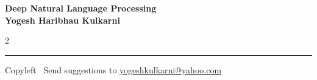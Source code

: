 \documentclass[8pt,landscape]{article}
\begin{document}
\footnotesize


\begin{center}
\Large{\textbf{Deep Natural Language Processing\\ Yogesh Haribhau Kulkarni}}  
\end{center}

\begin{multicols}{2}

\end{multicols}

\rule{\linewidth}{0.25pt}
\scriptsize
Copyleft \textcopyleft\  Send suggestions to 
\href{http://yati.io}{yogeshkulkarni@yahoo.com}
\end{document}

